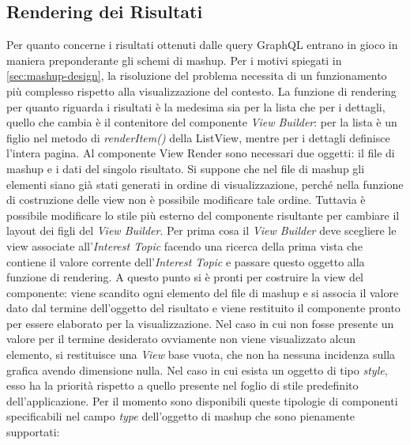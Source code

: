 \subsection{Rendering dei Risultati}\label{sec:view-risultati}

Per quanto concerne i risultati ottenuti dalle query GraphQL entrano in gioco in maniera preponderante gli schemi di mashup. Per i motivi spiegati in \ref{sec:mashup-design}, la risoluzione del problema necessita di un funzionamento più complesso rispetto alla visualizzazione del contesto. La funzione di rendering per quanto riguarda i risultati è la medesima sia per la lista che per i dettagli, quello che cambia è il contenitore del componente \emph{View Builder}: per la lista è un figlio nel metodo di \emph{renderItem()} della ListView, mentre per i dettagli definisce l'intera pagina.
Al componente View Render sono necessari due oggetti: il file di mashup e i dati del singolo risultato.
Si suppone che nel file di mashup gli elementi siano già stati generati in ordine di visualizzazione, perché nella funzione di costruzione  delle view non è possibile modificare tale ordine. Tuttavia è possibile modificare lo stile più esterno del componente risultante per cambiare il layout dei figli del \emph{View Builder}. Per prima cosa il \emph{View Builder} deve scegliere le view associate all'\emph{Interest Topic} facendo una ricerca della prima vista che contiene il valore corrente dell'\emph{Interest Topic} e passare questo oggetto alla funzione di rendering. A questo punto si è pronti per costruire la view del componente: viene scandito ogni elemento del file di mashup e si associa il valore dato dal termine dell'oggetto del risultato e viene restituito il componente pronto per essere elaborato per la visualizzazione. Nel caso in cui non fosse presente un valore per il termine desiderato ovviamente non viene visualizzato alcun elemento, si restituisce una \emph{View} base vuota, che non ha nessuna incidenza sulla grafica avendo dimensione nulla. Nel caso in cui esista un oggetto di tipo \emph{style}, esso ha la priorità rispetto a quello presente nel foglio di stile predefinito dell'applicazione. Per il momento sono disponibili queste tipologie di componenti specificabili nel campo \emph{type} dell'oggetto di mashup che sono pienamente supportati:

